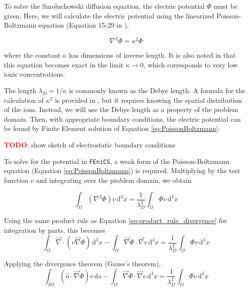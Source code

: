 To solve the Smoluchowski diffusion equation, the electric potential $\Phi$ must be given.
Here, we will calculate the electric potential using the linearized Poisson-Boltzmann equation
(Equation 15-29 in \cite{McQuarrie-StatMech}).

\begin{equation}\label{eq:PoissonBoltzmann}
\nabla^2 \Phi = \kappa^2 \Phi
\end{equation}

where the constant $\kappa$ has dimensions of inverse length.
It is also noted in \cite{McQuarrie-StatMech} that this equation becomes exact
in the limit $\kappa \rightarrow 0$,
which corresponds to very low ionic concentrations.

The length $\lambda_D = 1/\kappa$ is commonly known as the Debye length.
A formula for the calculation of $\kappa^2$ is provided in \cite{McQuarrie-StatMech},
but it requires knowing the spatial distribution of the ions.
Instead, we will use the Debye length as a property of the problem domain.
Then, with appropriate boundary conditions,
the electric potential can be found by Finite Element solution of Equation \ref{eq:PoissonBoltzmann}.

\textcolor{red}{\textbf{TODO}}: show sketch of electrostatic boundary conditions

To solve for the potential in \texttt{FEniCS},
a weak form of the Poisson-Boltzmann equation (Equation \ref{eq:PoissonBoltzmann}) is required.
Multiplying by the test function $v$ and integrating over the problem domain, we obtain

\begin{equation}
\int_{\Omega} \left(\nabla^2 \Phi \right) v \,\mathrm{d}^3x = \frac{1}{\lambda_D^2} \int_{\Omega} \Phi v \,\mathrm{d}^3x
\end{equation}

Using the same product rule as Equation \ref{eq:product_rule_divergence} for integration by parts, this becomes
\begin{equation}
\int_{\Omega} \vec{\nabla} \cdot \left( v \vec{\nabla} \Phi \right) \,\mathrm{d}^3x
- \int_{\Omega} \vec{\nabla}\Phi \cdot \vec{\nabla}v \,\mathrm{d}^3x
= \frac{1}{\lambda_D^2} \int_{\Omega} \Phi v \,\mathrm{d}^3x
\end{equation}

Applying the divergence theorem (Gauss's theorem),
\begin{equation}
\int_{\partial\Omega} \left( \hat{n} \cdot \vec{\nabla} \Phi \right) v \,\mathrm{d}s
- \int_{\Omega} \vec{\nabla}\Phi \cdot \vec{\nabla}v \,\mathrm{d}^3x
= \frac{1}{\lambda_D^2} \int_{\Omega} \Phi v \,\mathrm{d}^3x
\end{equation}

